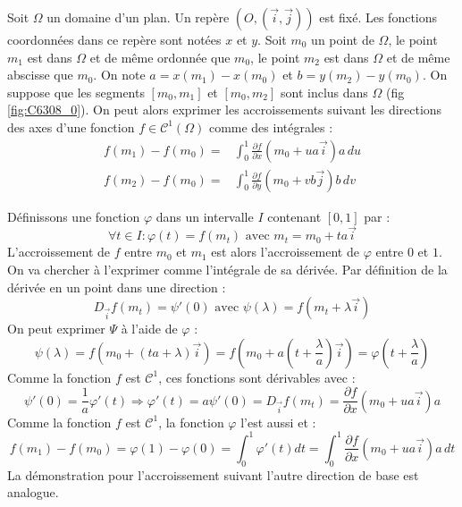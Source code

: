 \begin{prop}
 Soit $\Omega$ un domaine d'un plan. Un repère $(O,(\overrightarrow i, \overrightarrow j))$ est fixé. Les fonctions coordonnées dans ce repère sont notées $x$ et $y$. Soit $m_0$ un point de $\Omega$, le point $m_1$ est dans $\Omega$ et de même ordonnée que $m_0$, le point $m_2$ est dans $\Omega$ et de même abscisse que $m_0$. On note $a=x(m_1)-x(m_0)$ et $b=y(m_2)-y(m_0)$. On suppose que les segments  $[m_0,m_1]$ et $[m_0,m_2]$ sont inclus dans $\Omega$ (fig \ref{fig:C6308_0}).\newline
On peut alors exprimer les accroissements suivant les directions des axes d'une fonction $f\in \mathcal C^1(\Omega)$ comme des intégrales :
\begin{align*}
 f(m_1)-f(m_0) =& \int_{0}^{1}\frac{\partial f}{\partial x}\left( m_0+ua\overrightarrow i \right) a \,du \\
 f(m_2)-f(m_0) =& \int_{0}^{1}\frac{\partial f}{\partial y}\left( m_0+vb\overrightarrow j \right) b \,dv 
\end{align*}
\end{prop}
\begin{demo}
Définissons une fonction $\varphi$ dans un intervalle $I$ contenant $[0,1]$ par :
\begin{displaymath}
 \forall t\in I: \varphi(t)=f\left(m_t\right)\text{ avec } m_t=m_0+ ta\overrightarrow i
\end{displaymath}
L'accroissement de $f$ entre $m_0$ et $m_1$ est alors l'accroissement de $\varphi$ entre $0$ et $1$. On va chercher à l'exprimer comme l'intégrale de sa dérivée.\newline
 Par définition de la dérivée en un point dans une direction :
\begin{displaymath}
 D_{\overrightarrow i}f(m_t)=\psi'(0)\text{ avec } \psi(\lambda)=f(m_t+\lambda \overrightarrow i)
\end{displaymath}
On peut exprimer $\Psi$ à l'aide de $\varphi$ :
\begin{displaymath}
 \psi(\lambda)=f(m_0+ (ta+\lambda)\overrightarrow i)=f(m_0+ a(t+\frac{\lambda}{a})\overrightarrow i)=\varphi(t+\frac{\lambda}{a})
\end{displaymath}
Comme la fonction $f$ est $\mathcal C^1$, ces fonctions sont dérivables avec :
\begin{displaymath}
 \psi'(0) = \frac{1}{a}\varphi'(t)
\Rightarrow \varphi'(t) = a \psi'(0) = D_{\overrightarrow i}f(m_t) = \frac{\partial f}{\partial x}\left(m_0+ua\overrightarrow i\right) a
\end{displaymath}
Comme la fonction $f$ est $\mathcal C^1$, la fonction $\varphi$ l'est aussi et :
\begin{displaymath}
 f(m_1)-f(m_0)=\varphi(1)-\varphi(0)
=\int_0^1\varphi'(t)dt=\int_0^1 \frac{\partial f}{\partial x}\left(m_0+ua\overrightarrow i\right) a \,dt
\end{displaymath}
La démonstration pour l'accroissement suivant l'autre direction de base est analogue.
\end{demo}
